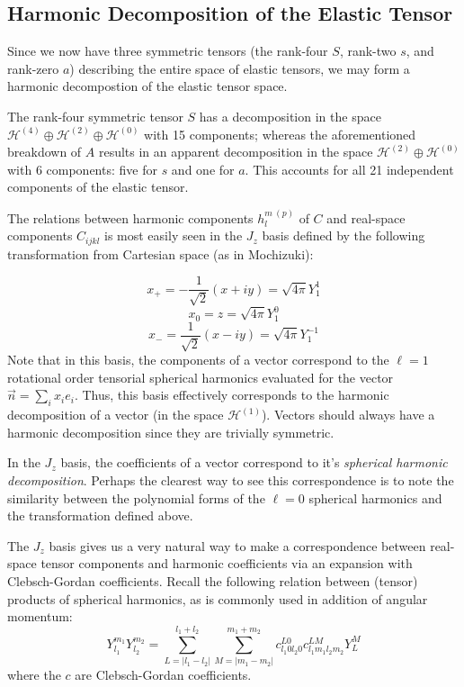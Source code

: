 \documentclass[10pt,a4paper]{article}
\begin{document}
\subsection{Harmonic Decomposition of the Elastic Tensor}

Since we now have three symmetric tensors (the rank-four $S$, rank-two $s$, and rank-zero $a$) describing the entire space of elastic tensors, we may form a harmonic decompostion of the elastic tensor space.

The rank-four symmetric tensor $S$ has a decomposition in the space $\mathcal{H}^{(4)}\oplus\mathcal{H}^{(2)}\oplus\mathcal{H}^{(0)}$ with 15 components; whereas the aforementioned breakdown of $A$ results in an apparent decomposition in the space $\mathcal{H}^{(2)}\oplus\mathcal{H}^{(0)}$ with 6 components: five for $s$ and one for $a$. This accounts for all 21 independent components of the elastic tensor.

The relations between harmonic components $h_{l}^{m\ (p)}$ of $C$ and real-space components $C_{ijkl}$ is most easily seen in the $J_z$ basis defined by the following transformation from Cartesian space (as in Mochizuki):

$$
x_{+} = -\frac{1}{\sqrt{2}} (x + i y) = \sqrt{4	\pi} Y_{1}^1
$$
$$
x_{0} = z = \sqrt{4	\pi} Y_{1}^0
$$
$$
x_{-} = \frac{1}{\sqrt{2}} (x - i y) = \sqrt{4	\pi} Y_{1}^{-1}
$$
Note that in this basis, the components of a vector correspond to the $\ell=1$ rotational order tensorial spherical harmonics evaluated for the vector $\vec{n} = \sum_i x_i e_i$. Thus, this basis effectively corresponds to the harmonic decomposition of a vector (in the space $\mathcal{H}^{(1)}$). Vectors should always have a harmonic decomposition since they are trivially symmetric.

In the $J_z$ basis, the coefficients of a vector correspond to it's \textit{spherical harmonic decomposition}. Perhaps the clearest way to see this correspondence is to note the similarity between the polynomial forms of the $\ell=0$ spherical harmonics and the transformation defined above.

The $J_z$ basis gives us a very natural way to make a correspondence between real-space tensor components and harmonic coefficients via an expansion with Clebsch-Gordan coefficients. Recall the following relation between (tensor) products of spherical harmonics, as is commonly used in addition of angular momentum:
$$
Y_{l_1}^{m_1}Y_{l_2}^{m_2} = \sum_{L = |l_1-l_2|}^{l_1+l_2}\sum_{M=|m_1-m_2|}^{m_1+m_2}c^{L0}_{l_1 0 l_2 0}c^{LM}_{l_1 m_1 l_2 m_2}Y_L^M
$$
where the $c$ are Clebsch-Gordan coefficients.
\end{document}
